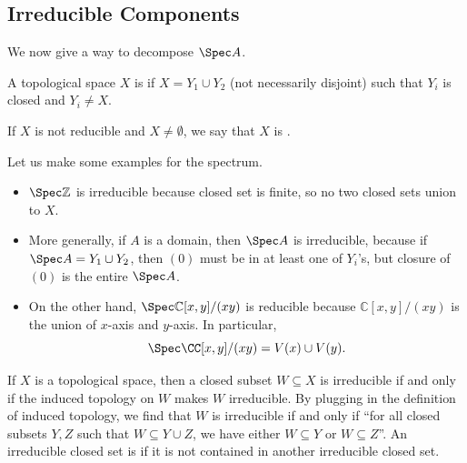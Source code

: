 \subsection{Irreducible Components}
We now give a way to decompose $\Spec A$.
\begin{definition}
    A topological space $X$ is  if $X=Y_1\cup Y_2$
    (not necessarily disjoint)
    such that $Y_i$ is closed and $Y_i\neq X$.

    If $X$ is not reducible and $X\neq\emptyset$, we say that $X$
    is .
\end{definition}
Let us make some examples for the spectrum.
\begin{example}
    \begin{itemize}
    \item $\Spec\mathbb Z$ is irreducible
    because closed set is finite,
    so no two closed sets union to $X$.
    \item More generally, if $A$ is a domain,
    then $\Spec A$ is irreducible, because if 
    $\Spec A = Y_1\cup Y_2$, then $(0)$ must be in at 
    least one of $Y_i$'s, but closure of $(0)$
    is the entire $\Spec A$.
    \item On the other hand, $\Spec\mathbb C[x,y]/(xy)$
    is reducible because 
    $\mathbb C[x,y]/(xy)$ is the union of $x$-axis
    and $y$-axis. In particular, 
    $$\Spec \CC[x,y]/(xy) = V(x)\cup V(y).$$
    \end{itemize}
\end{example}
If $X$ is a topological space, 
then a closed subset $W\subseteq X$ is irreducible 
if and only if the induced topology on $W$
makes $W$ irreducible.
By plugging in the definition of induced topology,
we find that $W$ is irreducible if and only if
``for all closed subsets $Y,Z$ such that $W\subseteq Y\cup Z$,
we have either $W\subseteq Y$ or $W\subseteq Z$''.
An irreducible closed set is 
if it is not contained in another irreducible closed set.

